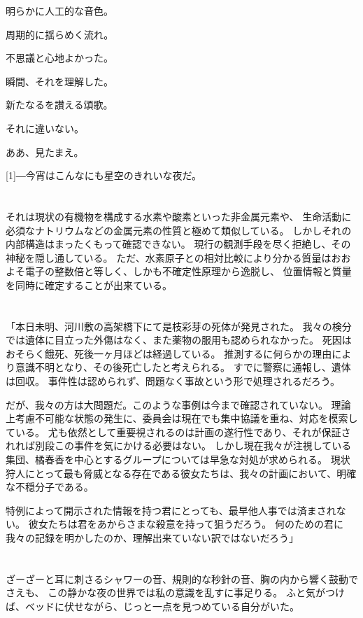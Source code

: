 \documentclass[autodetect-engine,dvipdfmx-if-dvi,a5paper,ja=standard,twoside,titlepage,final,twocolumn]{ltjtbook}
\begin{document}
明らかに人工的な音色。

周期的に揺らめく流れ。

不思議と心地よかった。

瞬間、それを理解した。

新たなるを讃える頌歌。

それに違いない。

ああ、見たまえ。

\scalebox{3}[1]{―}今宵はこんなにも星空のきれいな夜だ。
\section{}
それは現状の有機物を構成する水素や酸素といった非金属元素や、
生命活動に必須なナトリウムなどの金属元素の性質と極めて類似している。
しかしそれの内部構造はまったくもって確認できない。
現行の観測手段を尽く拒絶し、その神秘を隠し通している。
ただ、水素原子との相対比較により分かる質量はおおよそ電子の整数倍と等しく、しかも不確定性原理から逸脱し、
位置情報と質量を同時に確定することが出来ている。

\section{}
「本日未明、河川敷の高架橋下にて是枝彩芽の死体が発見された。
我々の検分では遺体に目立った外傷はなく、また薬物の服用も認められなかった。
死因はおそらく餓死、死後一ヶ月ほどは経過している。
推測するに何らかの理由により意識不明となり、その後死亡したと考えられる。
すでに警察に通報し、遺体は回収。
事件性は認められず、問題なく事故という形で処理されるだろう。

だが、我々の方は大問題だ。このような事例は今まで確認されていない。
理論上考慮不可能な状態の発生に、委員会は現在でも集中協議を重ね、対応を模索している。
尤も依然として重要視されるのは計画の遂行性であり、それが保証されれば別段この事件を気にかける必要はない。
しかし現在我々が注視している集団、橘春香を中心とするグループについては早急な対処が求められる。
現状狩人にとって最も脅威となる存在である彼女たちは、我々の計画において、明確な不穏分子である。

特例によって開示された情報を持つ君にとっても、最早他人事では済まされない。
彼女たちは君をあからさまな殺意を持って狙うだろう。
何のための君に我々の記録を明かしたのか、理解出来ていない訳ではないだろう」

\section{}
ざーざーと耳に刺さるシャワーの音、規則的な秒針の音、胸の内から響く鼓動でさえも、
この静かな夜の世界では私の意識を乱すに事足りる。
ふと気がつけば、ベッドに伏せながら、じっと一点を見つめている自分がいた。
\end{document}
